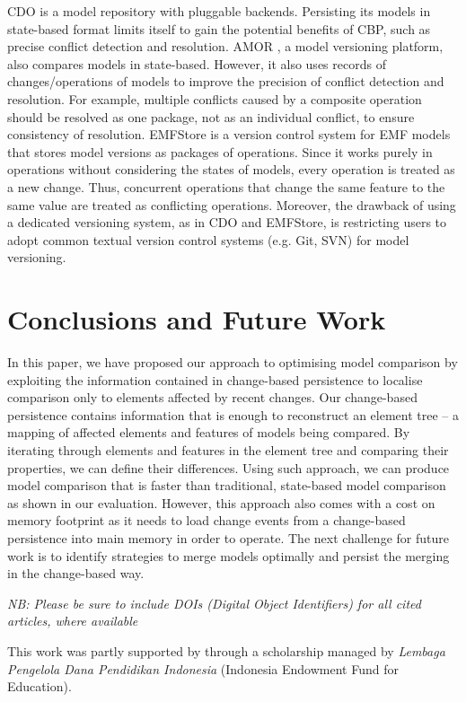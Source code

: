 \documentclass{jot}
\begin{document}
CDO \cite{eclipse2019cdo} is a model repository with pluggable backends. Persisting its models in state-based format limits itself to gain the potential benefits of CBP, such as precise conflict detection and resolution. AMOR \cite{DBLP:conf/sfm/BroschKLSWW12}, a model versioning platform, also compares models in state-based. However, it also uses records of changes/operations of models to improve the precision of conflict detection and resolution. For example, multiple conflicts caused by a composite operation should be resolved as one package, not as an individual conflict, to ensure consistency of resolution. EMFStore \cite{koegel2010emfstore} is a version control system for EMF models that stores model versions as packages of operations. Since it works purely in operations without considering the states of models, every operation is treated as a new change. Thus, concurrent operations that change the same feature to the same value are treated as conflicting operations. Moreover, the drawback of using a dedicated versioning system, as in CDO and EMFStore, is restricting users to adopt common textual version control systems (e.g. Git, SVN) for model versioning.  

\section{Conclusions and Future Work}
\label{sec:conclusion_and_future_work}
In this paper, we have proposed our approach to optimising model comparison by exploiting the information contained in change-based persistence to localise comparison only to elements affected by recent changes. Our change-based persistence contains information that is enough to reconstruct an element tree -- a mapping of affected elements and features of models being compared. By iterating through elements and features in the element tree and comparing their properties, we can define their differences. Using such approach, we can produce model comparison that is faster than traditional, state-based model comparison as shown in our evaluation. However, this approach also comes with a cost on memory footprint as it needs to load change events from a change-based persistence into main memory in order to operate. The next challenge for future work is to identify strategies to merge models optimally and persist the merging in the change-based way. 

\backmatter

\emph{NB: Please be sure to include DOIs (Digital Object Identifiers) for all cited articles, where available}





\begin{acknowledgments}
This work was partly supported by through a scholarship managed by \emph{Lembaga Pengelola Dana Pendidikan Indonesia} (Indonesia Endowment Fund for Education).
\end{acknowledgments}
\end{document}
